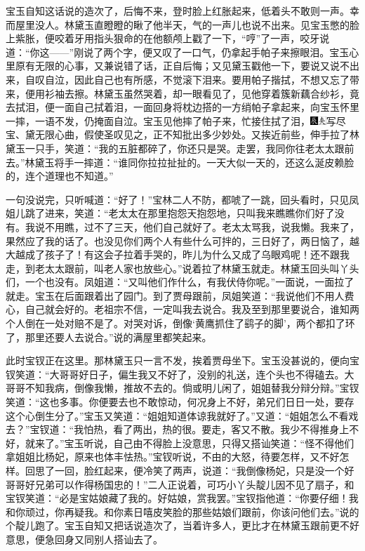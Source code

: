 宝玉自知这话说的造次了，后悔不来，登时脸上红胀起来，低着头不敢则一声。幸而屋里没人。林黛玉直瞪瞪的瞅了他半天，气的一声儿也说不出来。见宝玉憋的脸上紫胀，便咬着牙用指头狠命的在他额颅上戳了一下，``哼''了一声，咬牙说道：``你这------''刚说了两个字，便又叹了一口气，仍拿起手帕子来擦眼泪。宝玉心里原有无限的心事，又兼说错了话，正自后悔；又见黛玉戳他一下，要说又说不出来，自叹自泣，因此自己也有所感，不觉滚下泪来。要用帕子揩拭，不想又忘了带来，便用衫袖去擦。林黛玉虽然哭着，却一眼看见了，见他穿着簇新藕合纱衫，竟去拭泪，便一面自己拭着泪，一面回身将枕边搭的一方绡帕子拿起来，向宝玉怀里一摔，一语不发，仍掩面自泣。宝玉见他摔了帕子来，忙接住拭了泪，{\includegraphics[width=3mm]{../Images/00009}\includegraphics[width=3mm]{../Images/00012}\footnotesize \kaishu 写尽宝、黛无限心曲，假使圣叹见之，正不知批出多少妙处。}又挨近前些，伸手拉了林黛玉一只手，笑道：``我的五脏都碎了，你还只是哭。走罢，我同你往老太太跟前去。''林黛玉将手一摔道：``谁同你拉拉扯扯的。一天大似一天的，还这么涎皮赖脸的，连个道理也不知道。''

一句没说完，只听喊道：``好了！''宝林二人不防，都唬了一跳，回头看时，只见凤姐儿跳了进来，笑道：``老太太在那里抱怨天抱怨地，只叫我来瞧瞧你们好了没有。我说不用瞧，过不了三天，他们自己就好了。老太太骂我，说我懒。我来了，果然应了我的话了。也没见你们两个人有些什么可拌的，三日好了，两日恼了，越大越成了孩子了！有这会子拉着手哭的，昨儿为什么又成了乌眼鸡呢！还不跟我走，到老太太跟前，叫老人家也放些心。''说着拉了林黛玉就走。林黛玉回头叫丫头们，一个也没有。凤姐道：``又叫他们作什么，有我伏侍你呢。''一面说，一面拉了就走。宝玉在后面跟着出了园门。到了贾母跟前，凤姐笑道：``我说他们不用人费心，自己就会好的。老祖宗不信，一定叫我去说合。我及至到那里要说合，谁知两个人倒在一处对赔不是了。对哭对诉，倒像`黄鹰抓住了鹞子的脚'，两个都扣了环了，那里还要人去说合。''说的满屋里都笑起来。

此时宝钗正在这里。那林黛玉只一言不发，挨着贾母坐下。宝玉没甚说的，便向宝钗笑道：``大哥哥好日子，偏生我又不好了，没别的礼送，连个头也不得磕去。大哥哥不知我病，倒像我懒，推故不去的。倘或明儿闲了，姐姐替我分辩分辩。''宝钗笑道：``这也多事。你便要去也不敢惊动，何况身上不好，弟兄们日日一处，要存这个心倒生分了。''宝玉又笑道：``姐姐知道体谅我就好了。''又道：``姐姐怎么不看戏去？''宝钗道：``我怕热，看了两出，热的很。要走，客又不散。我少不得推身上不好，就来了。''宝玉听说，自己由不得脸上没意思，只得又搭讪笑道：``怪不得他们拿姐姐比杨妃，原来也体丰怯热。''宝钗听说，不由的大怒，待要怎样，又不好怎样。回思了一回，脸红起来，便冷笑了两声，说道：``我倒像杨妃，只是没一个好哥哥好兄弟可以作得杨国忠的！''二人正说着，可巧小丫头靛儿因不见了扇子，和宝钗笑道：``必是宝姑娘藏了我的。好姑娘，赏我罢。''宝钗指他道：``你要仔细！我和你顽过，你再疑我。和你素日嘻皮笑脸的那些姑娘们跟前，你该问他们去。''说的个靛儿跑了。宝玉自知又把话说造次了，当着许多人，更比才在林黛玉跟前更不好意思，便急回身又同别人搭讪去了。

